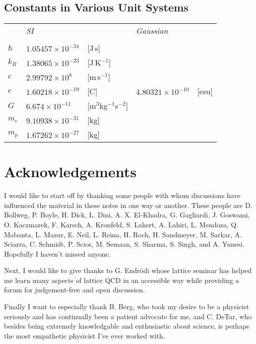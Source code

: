 \documentclass[12pt]{book}
\theoremstyle{definition}
\newenvironment{frontstuff}
  {\centering\chapter*{}}
  {\clearpage}
\begin{document}
\begin{frontstuff}
\section*{Constants in Various Unit Systems}
\begin{tabularx}{\linewidth}{LlLll}
 & {\it SI} && {\it Gaussian}&\\ 
\vspace{2mm}\\
$\hbar$  & $1.05457\times 10^{-34}$ & [J\,s]
         & & \\
$k_B$    & $1.38065\times 10^{-23}$ & [J\,K$^{-1}$]
         & & \\
$c$      & $2.99792\times 10^8$ & [m\,s$^{-1}$]
         & & \\
$e$      & $1.60218\times 10^{-19}$ & [C] 
         & $4.80321\times 10^{-10}$ & [esu]\\
$G$      & $6.674\times 10^{-11}$ & [m$^3$kg$^{-1}$s$^{-2}$]
         & & \\
$m_e$    & $9.10938\times 10^{-31}$ & [kg]
         & & \\
$m_p$    & $1.67262\times 10^{-27}$ & [kg]
         & & \\
\end{tabularx}
\clearpage


\end{frontstuff} %


\chapter{Acknowledgements}

I would like to start off by thanking some people with whom discussions
have influenced the material in these notes in one way or another.
These people are
D. Bollweg,
P. Boyle,
H. Dick,
L. Dini,
A. X. El-Khadra,
G. Gagliardi,
J. Goswami,
O. Kaczmarek,
F. Karsch,
A. Kronfeld,
S. Lahert,
A. Lahiri,
L. Mendoza,
Q. Mabanta,
L. Mazur,
E. Neil,
L. Reina,
H. Roch,
H. Sandmeyer,
M. Sarkar,
A. Sciarra,
C. Schmidt,
P. Scior,
M. Semaan,
S. Sharma,
S. Singh,
and
A. Yunesi.
Hopefully I haven't missed anyone.

Next, I would like to give thanks to G. Endr\"odi whose lattice seminar
has helped me learn many aspects of lattice QCD in an accessible way while
providing a forum for judgement-free and open discussion.

Finally I want to especially thank B. Berg, who took my desire to be a
physicist seriously and has continually been a patient advocate for me,
and C. DeTar, who besides being extremely knowledgable and enthusiastic about
science, is perhaps the most empathetic physicist I've ever worked with.
\end{document}
